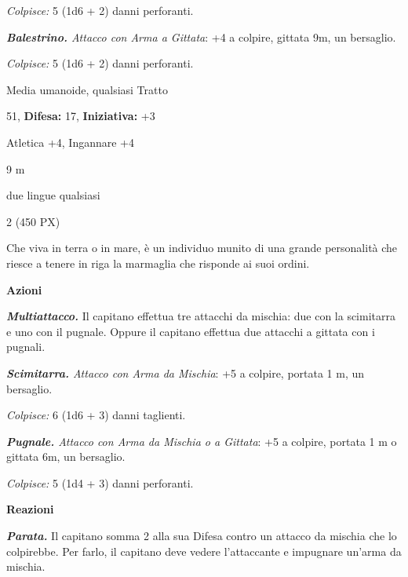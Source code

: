 \begin{multicols}{2}
{\emph{Colpisce:} 5 (1d6 + 2) danni perforanti.

\emph{\textbf{Balestrino.} Attacco con Arma a Gittata}: +4 a colpire, gittata 9m, un bersaglio.

\emph{Colpisce:} 5 (1d6 + 2) danni perforanti.

\begin{description}[noitemsep, topsep=0pt, parsep=0pt, partopsep=0pt, leftmargin=0cm, labelwidth=2.2cm]
    \item[\textbf{Taglia/Tipo:}] Media umanoide, qualsiasi Tratto
    \item[\textbf{Caratt.:}] 
    \item[\textbf{Punti Ferita:}] 51,  \textbf{Difesa:} 17,  \textbf{Iniziativa:} +3
    \item[\textbf{Comp.:}] Atletica +4, Ingannare +4
    \item[\textbf{Tiri Salvez.:}] 
    \item[\textbf{Movimento:}] 9 m
    \item[\textbf{Linguaggi:}]  due lingue qualsiasi
    \item[\textbf{Sfida:}] 2 (450 PX)\smallskip
\end{description}

Che viva in terra o in mare, è un individuo munito di una grande personalità che riesce a tenere in riga la marmaglia che risponde ai suoi ordini.

\textbf{Azioni}

\emph{\textbf{Multiattacco.}} Il capitano effettua tre attacchi da mischia: due con la scimitarra e uno con il pugnale. Oppure il capitano effettua due attacchi a gittata con i pugnali.

\emph{\textbf{Scimitarra.} Attacco con Arma da Mischia}: +5 a colpire, portata 1 m, un bersaglio.

\emph{Colpisce:} 6 (1d6 + 3) danni taglienti.

\emph{\textbf{Pugnale.} Attacco con Arma da Mischia o a Gittata}: +5 a colpire, portata 1 m o gittata 6m, un bersaglio.

\emph{Colpisce:} 5 (1d4 + 3) danni perforanti.

\textbf{Reazioni}

\emph{\textbf{Parata.}} Il capitano somma 2 alla sua Difesa contro un attacco da mischia che lo colpirebbe. Per farlo, il capitano deve vedere l'attaccante e impugnare un'arma da mischia.

}
\end{multicols}
